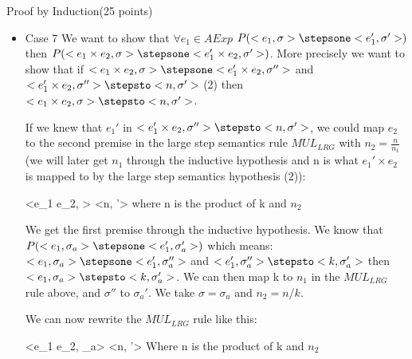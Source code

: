 \documentclass{article}
\begin{document}
\begin{question}{Proof by Induction}{(25 points)}
\begin{subquestion}
\begin{itemize}
The first premise comes for free thanks to the axiom $INT_{LRG}$ and the second premise comes through the inductive hypothesis. By IH, we know that $P(<e_2, \sigma_a>  \stepsone <e_2', \sigma_a'>)$ which means: $<e_2, \sigma_a> \stepsone <e_2', \sigma_a''>$ and $<e_2', \sigma_a''> \stepsto <h, \sigma_a'>$ then $<e_2, \sigma_a> \stepsto <h, \sigma_a'>$. We can then map h to $n_2$ in the $ADD_{LRG}$ rule above. We take $\sigma = \sigma_a$.

We can now rewrite the $ADD_{LRG}$ rule like this:

{
	<k + e_2, \sigma> \stepsto <n, \sigma'>
}
{
	with n being the sum of k and h
}



\item Case 7 We want to show that $\forall e_1 \in AExp$ $P(<e_1, \sigma> \stepsone <e_1', \sigma'>)$ then $P(<e_1 \times e_2, \sigma> \stepsone <e_1' \times e_2, \sigma'>)$. More precisely we want to show that if $<e_1 \times e_2, \sigma> \stepsone <e_1' \times e_2, \sigma''>$ and $<e_1' \times e_2, \sigma''> \stepsto <n, \sigma'>$ (2) then $<e_1 \times e_2, \sigma> \stepsto <n, \sigma'>$.

If we knew that $e_1'$ in $<e_1'  \times e_2, \sigma''> \stepsto <n, \sigma'>$, we could map $e_2$ to the second premise in the large step semantics rule $MUL_{LRG}$ with $n_2 = \frac{n} {n_1}$ (we will later get $n_1$ through the inductive hypothesis and n is what $e_1' \times e_2$ is mapped to by the large step semantics hypothesis (2)):

{
	<e_1 \times e_2, \sigma> \stepsto <n, \sigma'>
}
{
	where n is the product of k and $n_2$
}

We get the first premise through the inductive hypothesis. We know that $P(<e_1, \sigma_a>  \stepsone <e_1', \sigma_a'>)$ which means: $<e_1, \sigma_a> \stepsone <e_1', \sigma_a''>$ and $<e_1', \sigma_a''> \stepsto <k, \sigma_a'>$ then $<e_1, \sigma_a> \stepsto <k, \sigma_a'>$. We can then map k to $n_1$ in the $MUL_{LRG}$ rule above, and $\sigma''$ to $\sigma_a'$. We take $\sigma = \sigma_a$ and $n_2 = n / k$.

We can now rewrite the $MUL_{LRG}$ rule like this:

{
	<e_1 \times e_2, \sigma_a> \stepsto <n, \sigma'>
}
{
	Where n is the product of k and $n_2$
}


\end{itemize}
\end{subquestion}
\end{question}
\end{document}

